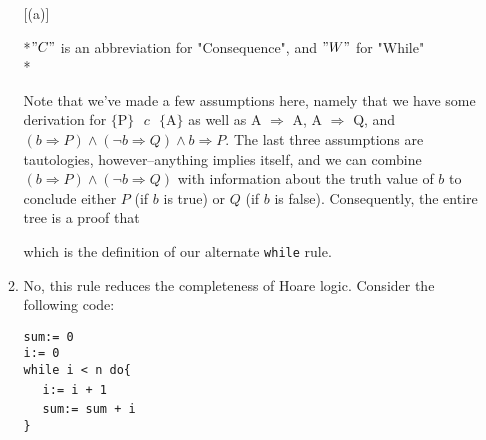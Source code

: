 \documentclass[10pt, oneside]{article}
\begin{document}
\begin{enumerate}[1.]
\begin{enumerate} [(a)]
\begin{prooftree}
        
      \end{prooftree}
      
      *$"C"$ is an abbreviation for "Consequence", and $"W"$ for "While" \\*
      
      Note that we've made a few assumptions here, namely that we have some 
      derivation for $\{\text{P}\} \text{ } c \text{ } \{\text{A}\}$ as well as 
      A $\Rightarrow$ A, A $\Rightarrow$ Q, and $(b \Rightarrow P) \wedge (\neg b 
      \Rightarrow Q) \wedge b \Rightarrow P$. The last three assumptions are 
      tautologies, however--anything implies itself, and we can combine $(b 
      \Rightarrow P) \wedge (\neg b \Rightarrow Q)$ with information about the
      truth value of $b$ to conclude either $P$ (if $b$ is true) or $Q$ (if $b$ 
      is false). Consequently, the entire tree is a proof that 
      
      \begin{prooftree}
      \end{prooftree}
      
      which is the definition of our alternate \texttt{while} rule.
      
      
    \item 
      No, this rule reduces the completeness of Hoare logic. Consider the following
      code:
      
      \texttt{sum:= 0} \\
      \texttt{i:= 0} \\
      \texttt{while i < n do\{} \\
      \indent \texttt{ } \texttt{ i:= i + 1} \\ 
      \indent \texttt{ } \texttt{ sum:= sum + i} \\
      \texttt{\}} \\
      

\end{enumerate}
\end{enumerate}
\end{document}
